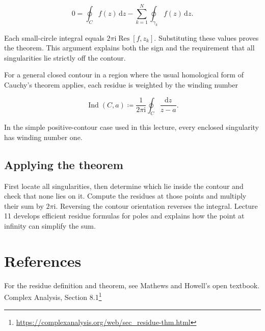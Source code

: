 \documentclass[11pt,a4paper]{article}
\theoremstyle{definition}
\theoremstyle{plain}
\begin{document}
\[
0=\oint_C f(z)\,\mathrm{d}z-\sum_{k=1}^{N}\oint_{\gamma_k}f(z)\,\mathrm{d}z.
\]

Each small-circle integral equals $2\pi\mathrm{i}\operatorname{Res}[f,z_k]$. Substituting these values proves the theorem. This argument explains both the sign and the requirement that all singularities lie strictly off the contour.

For a general closed contour in a region where the usual homological form of Cauchy's theorem applies, each residue is weighted by the winding number

\[
\operatorname{Ind}(C,a)\coloneqq
\frac1{2\pi\mathrm{i}}\oint_C\frac{\mathrm{d}z}{z-a}.
\]

In the simple positive-contour case used in this lecture, every enclosed singularity has winding number one.

\subsection{Applying the theorem}

First locate all singularities, then determine which lie inside the contour and check that none lies on it. Compute the residues at those points and multiply their sum by $2\pi\mathrm{i}$. Reversing the contour orientation reverses the integral. Lecture 11 develops efficient residue formulas for poles and explains how the point at infinity can simplify the sum.

\section{References}

For the residue definition and theorem, see Mathews and Howell's open textbook. Complex Analysis, Section 8.1\footnote{\url{https://complexanalysis.org/web/sec_residue-thm.html}}
\end{document}
